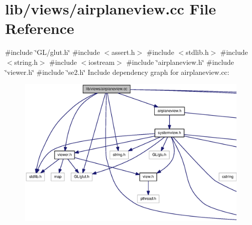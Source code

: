\section{lib/views/airplaneview.cc \-File \-Reference}
\label{airplaneview_8cc}
{\ttfamily \#include \char`\"{}\-G\-L/glut.\-h\char`\"{}}\*
{\ttfamily \#include $<$assert.\-h$>$}\*
{\ttfamily \#include $<$stdlib.\-h$>$}\*
{\ttfamily \#include $<$string.\-h$>$}\*
{\ttfamily \#include $<$iostream$>$}\*
{\ttfamily \#include \char`\"{}airplaneview.\-h\char`\"{}}\*
{\ttfamily \#include \char`\"{}viewer.\-h\char`\"{}}\*
{\ttfamily \#include \char`\"{}se2.\-h\char`\"{}}\*
\-Include dependency graph for airplaneview.\-cc\-:
\nopagebreak
\begin{figure}[H]
\begin{center}
\leavevmode
\includegraphics[width=350pt]{airplaneview_8cc__incl}
\end{center}
\end{figure}
